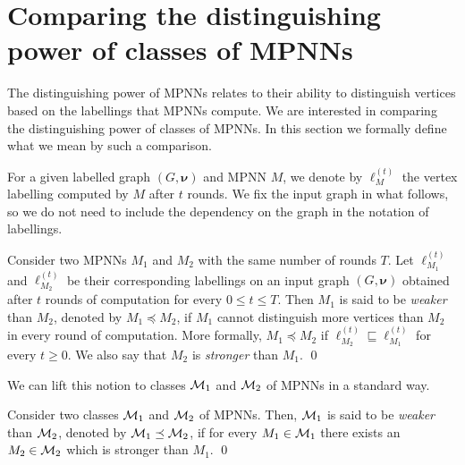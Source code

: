 \section{Comparing the distinguishing power of classes of MPNNs}\label{subsec:compare}
The distinguishing power of MPNNs relates to their ability to distinguish vertices based on the labellings that MPNNs compute. We are interested in comparing the distinguishing power of classes of MPNNs. In this section we formally define what we
mean by such a comparison.

For a given labelled graph $( G,\pmb{\nu})$ and MPNN $M$, we denote by 
$\pmb{\ell}_M^{(t)}$ the vertex labelling computed by $M$ after $t$ rounds. We fix the input graph in what follows, so we do not need to include the dependency on the graph in the notation of labellings.

\begin{definition}\label{def:mpnnweak}\normalfont
Consider two MPNNs $M_1$ and $M_2$ with the same number of rounds $T$. Let $\pmb{\ell}_{M_1}^{(t)}$ and $\pmb{\ell}_{M_2}^{(t)}$  be their corresponding labellings on an input graph $( G,\pmb{\nu})$ obtained after $t$ rounds of computation for every $0 \le t \le T$. Then
$M_1$ is said to be \textit{weaker} than $M_2$, denoted by $M_1\preceq M_2$, if $M_1$ cannot distinguish more vertices  than $M_2$ in every round of computation. More formally, $M_1\preceq M_2$ if $\pmb{\ell}_{M_2}^{(t)}\sqsubseteq
\pmb{\ell}_{M_1}^{(t)}$ for every $t\geq 0$. We also say that $M_2$ is \textit{stronger} than $M_1$. \qed
\end{definition}
We can lift this notion to classes  $\mathcal{M}_1$ and $\mathcal{M}_2$ of MPNNs in a standard way. 

\begin{definition}\label{def:classesweak}\normalfont
Consider two classes $\mathcal{M}_1$ and $\mathcal{M}_2$ of MPNNs.
Then, $\mathcal{M}_1$ is said to be \textit{weaker} than $\mathcal{M}_2$, denoted by 
$\mathcal{M}_1\preceq \mathcal{M}_2$, if for every $M_1\in \mathcal{M}_1$
there exists an $M_2\in\mathcal{M}_2$ which is stronger than $M_1$. \qed
\end{definition}

